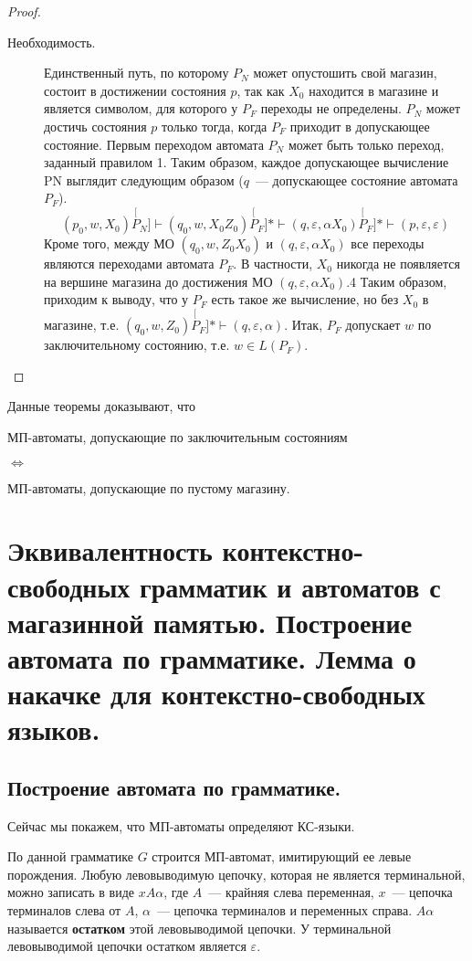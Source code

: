 \documentclass[a4paper,12pt]{article}
\begin{document}
\begin{proof}
\begin{description}
		\item[Необходимость.] Единственный путь, по которому $P_N$ может опустошить свой магазин, состоит в достижении состояния $p$, так как $X_0$ находится в магазине и является символом, для которого у $P_F$ переходы не определены. $P_N$ может достичь состояния $p$ только тогда, когда $P_F$ приходит в допускающее состояние. Первым переходом автомата $P_N$ может быть только переход, заданный правилом 1. Таким образом, каждое допускающее вычисление PN выглядит следующим образом ($q$~--- допускающее состояние автомата $P_F$).
		\[(p_0, w, X_0) \stackrel[P_N]{}{\vdash} (q_0, w, X_0Z_0)  \stackrel[P_F]{*}{\vdash} (q, \varepsilon, \alpha X_0) \stackrel[P_F]{*}{\vdash} (p, \varepsilon, \varepsilon)\]
		Кроме того, между МО $(q_0, w, Z_0X_0)$ и $(q, \varepsilon, \alpha X_0)$ все переходы являются переходами автомата $P_F$. В частности, $X_0$ никогда не появляется на вершине магазина до достижения МО $(q, \varepsilon, \alpha X_0)$.4 Таким образом, приходим к выводу, что у $P_F$ есть такое же вычисление, но без $X_0$ в магазине, т.е. $(q_0, w, Z_0) \stackrel[P_F]{*}{\vdash} (q, \varepsilon, \alpha)$. Итак, $P_F$ допускает $w$ по заключительному состоянию, т.е. $w \in L(P_F)$.
	\end{description}
\end{proof}

Данные теоремы доказывают, что
\begin{center}
	\begin{minipage}[c]{0.4\textwidth}
		\center МП-автоматы, допускающие по заключительным состояниям
	\end{minipage}
	 $\iff$ 
	 \begin{minipage}[c]{0.4\textwidth}
	 	\center МП-автоматы, допускающие по пустому магазину.
	 \end{minipage}
\end{center}

\section{Эквивалентность контекстно-свободных грамматик и автоматов с магазинной памятью. Построение автомата по грамматике. Лемма о накачке для контекстно-свободных языков. }
\subsection{Построение автомата по грамматике.}
Сейчас мы покажем, что МП-автоматы определяют КС-языки.

По данной грамматике $G$ строится МП-автомат, имитирующий ее левые порождения. Любую левовыводимую цепочку, которая не является терминальной, можно записать в виде $xA\alpha$, где $A$~--- крайняя слева переменная, $x$~--- цепочка терминалов слева от $A$, $\alpha$~--- цепочка терминалов и переменных справа. $A\alpha$ называется \textbf{остатком} этой левовыводимой цепочки. У терминальной левовыводимой цепочки остатком является $\varepsilon$.
\end{document}
